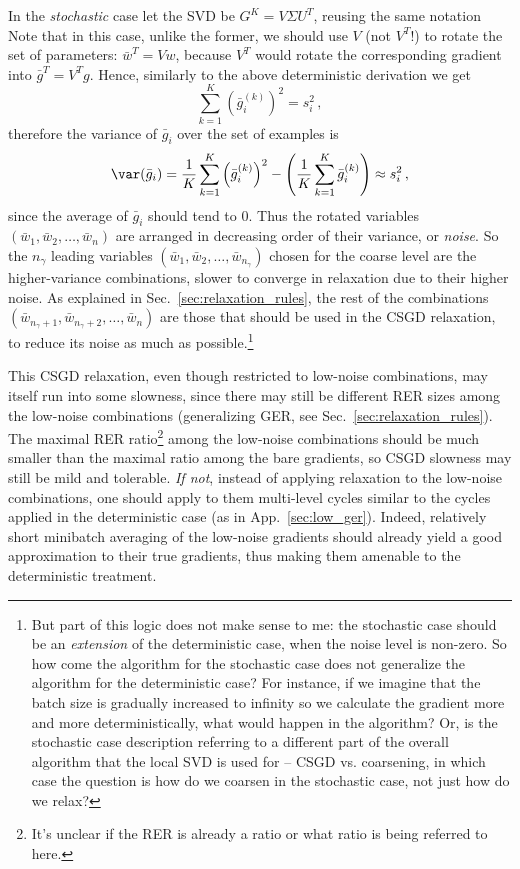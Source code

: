 \documentclass{article} %
\begin{document}
In the {\it stochastic} case let the SVD be $G^K = V \Sigma U^T$, reusing the same notation Note that in this case, unlike the former, we should use $V$ (not $V^T$!) to rotate the set of parameters: $\bar{w}^T = V w$, because $V^T$ would rotate the corresponding gradient into $\bar{g}^T = V^T g$. Hence, similarly to the above deterministic derivation we get
$$ \sum_{k=1}^K \left(\bar{g}_i^{(k)}\right)^2 = s_i^2\,,$$
therefore the variance of $\bar{g}_i$ over the set of examples is
$$ \var(\bar{g}_i) = \frac{1}{K} \sum_{k=1}^K \left(\bar{g}_i^{(k)}\right)^2 - \left(\frac{1}{K} \sum_{k=1}^K \bar{g}_i^{(k)} \right) \approx s_i^2\,,$$
since the average of $\bar{g}_i$ should tend to $0$. Thus the rotated variables $(\bar{w}_1,\bar{w}_2,\dots,\bar{w}_n)$ are arranged in decreasing order of their variance, or {\it noise}. So the $n_{\gamma}$ leading variables $(\bar{w}_1,\bar{w}_2,\dots,\bar{w}_{n_{\gamma}})$ chosen for the coarse level are the higher-variance combinations, slower to converge in relaxation due to their higher noise. As explained in Sec.~\ref{sec:relaxation_rules}, the rest of the combinations $(\bar{w}_{n_{\gamma}+1},\bar{w}_{n_{\gamma}+2},\dots,\bar{w}_n)$ are those that should be used in the CSGD relaxation, to reduce its noise as much as possible.\footnote{But part of this logic does not make sense to me: the stochastic case should be an {\it extension} of the deterministic case, when the noise level is non-zero. So how come the algorithm for the stochastic case does not generalize the algorithm for the deterministic case? For instance, if we imagine that the batch size is gradually increased to infinity so we calculate the gradient more and more deterministically, what would happen in the algorithm? Or, is the stochastic case description referring to a different part of the overall algorithm that the local SVD is used for -- CSGD vs. coarsening, in which case the question is how do we coarsen in the stochastic case, not just how do we relax?}

This CSGD relaxation, even though restricted to low-noise combinations, may itself run into some slowness, since there may still be different RER sizes among the low-noise combinations (generalizing GER, see Sec.~\ref{sec:relaxation_rules}). The maximal RER ratio\footnote{It's unclear if the RER is already a ratio or what ratio is being referred to here.} among the low-noise combinations should be much smaller than the maximal ratio among the bare gradients, so CSGD slowness may still be mild and tolerable. {\it If not}, instead of applying relaxation to the low-noise combinations, one should apply to them multi-level cycles similar to the cycles applied in the deterministic case (as in App.~\ref{sec:low_ger}). Indeed, relatively short minibatch averaging of the low-noise gradients should already yield a good approximation to their true gradients, thus making them amenable to the deterministic treatment.
\end{document}
